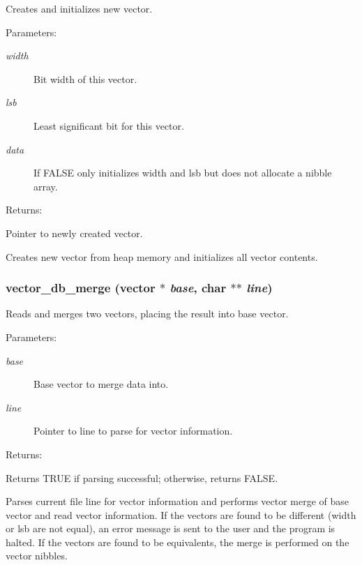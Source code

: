 Creates and initializes new vector.

\begin{Desc}
\item[Parameters: ]\par
\begin{description}
\item[{\em 
width}]Bit width of this vector. \item[{\em 
lsb}]Least significant bit for this vector. \item[{\em 
data}]If FALSE only initializes width and lsb but does not allocate a nibble array.\end{description}
\end{Desc}
\begin{Desc}
\item[Returns: ]\par
Pointer to newly created vector.\end{Desc}
Creates new vector from heap memory and initializes all vector contents. 
\subsubsection{ vector\_\-db\_\-merge ({\bf vector} $\ast$ {\em base}, char $\ast$$\ast$ {\em line})}\label{vector_8h_a4}


Reads and merges two vectors, placing the result into base vector.

\begin{Desc}
\item[Parameters: ]\par
\begin{description}
\item[{\em 
base}]Base vector to merge data into. \item[{\em 
line}]Pointer to line to parse for vector information.\end{description}
\end{Desc}
\begin{Desc}
\item[Returns: ]\par
Returns TRUE if parsing successful; otherwise, returns FALSE.\end{Desc}
Parses current file line for vector information and performs vector merge of  base vector and read vector information. If the vectors are found to be different (width or lsb are not equal), an error message is sent to the user and the program is halted. If the vectors are found to be equivalents, the merge is performed on the vector nibbles. 
